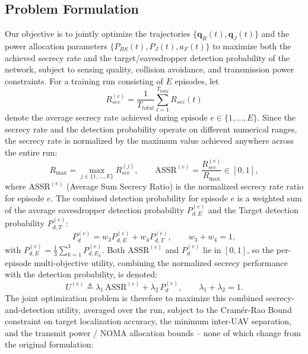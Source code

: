\documentclass[journal,onecolumn]{IEEEtran}
\begin{document}
\subsection{Problem Formulation}
\label{sec:problem}
Our objective is to jointly optimize the trajectories $\{\mathbf{q}_R(t), \mathbf{q}_J(t)\}$ and the power allocation parameters $\{P_{BS}(t), P_J(t), a_F(t)\}$ to maximize both the achieved secrecy rate and the target/eavesdropper detection probability of the network, subject to sensing quality, collision avoidance, and transmission power constraints. For a training run consisting of $E$ episodes, let
\begin{equation}
    R_{sec}^{(e)} = \frac{1}{T_{total}} \sum_{t=1}^{T_{total}} R_{sec}(t)
\end{equation}
denote the average secrecy rate achieved during episode $e \in \{1, \dots, E\}$. Since the secrecy rate and the detection probability operate on different numerical ranges, the secrecy rate is normalized by the maximum value achieved anywhere across the entire run:
\begin{equation}
    R_{\max} = \max_{j \in \{1, \dots, E\}} R_{sec}^{(j)}, \qquad
    \text{ASSR}^{(e)} = \frac{R_{sec}^{(e)}}{R_{\max}} \in [0, 1],
\end{equation}
where $\text{ASSR}^{(e)}$ (Average Sum Secrecy Ratio) is the normalized secrecy rate ratio for episode $e$. The combined detection probability for episode $e$ is a weighted sum of the average eavesdropper detection probability $P_{d,E}^{(e)}$ and the Target detection probability $P_{d,T}^{(e)}$:
\begin{equation}
    P_d^{(e)} = w_3 P_{d,E}^{(e)} + w_4 P_{d,T}^{(e)}, \qquad w_3 + w_4 = 1,
\end{equation}
with $P_{d,E}^{(e)} = \frac{1}{3}\sum_{k=1}^3 P_{d,E_k}^{(e)}$. Both $\text{ASSR}^{(e)}$ and $P_d^{(e)}$ lie in $[0,1]$, so the per-episode multi-objective utility, combining the normalized secrecy performance with the detection probability, is denoted:
\begin{equation}
    U^{(e)} \triangleq \lambda_1 \,\text{ASSR}^{(e)} + \lambda_2 \,P_d^{(e)}, \qquad \lambda_1 + \lambda_2 = 1.
\end{equation}
The joint optimization problem is therefore to maximize this combined secrecy-and-detection utility, averaged over the run, subject to the Cram\'{e}r-Rao Bound constraint on target localization accuracy, the minimum inter-UAV separation, and the transmit power / NOMA allocation bounds -- none of which change from the original formulation:
\end{document}
